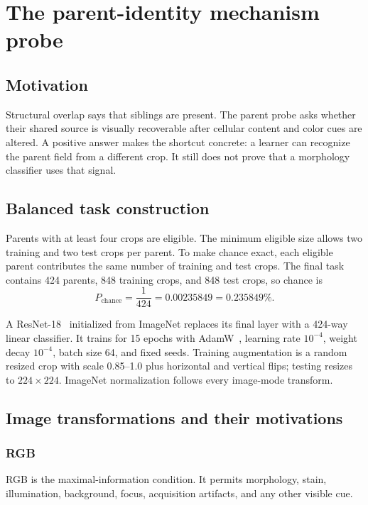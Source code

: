 \chapter{The parent-identity mechanism probe}\label{s1:ch:ch09_the_parent_identity_mechanism_probe}

\section{Motivation}

Structural overlap says that siblings are present. The parent probe asks whether their shared source is visually recoverable after cellular content and color cues are altered. A positive answer makes the shortcut concrete: a learner can recognize the parent field from a different crop. It still does not prove that a morphology classifier uses that signal.

\section{Balanced task construction}

Parents with at least four crops are eligible. The minimum eligible size allows two training and two test crops per parent. To make chance exact, each eligible parent contributes the same number of training and test crops. The final task contains 424 parents, 848 training crops, and 848 test crops, so chance is
\begin{equation}
P_{\mathrm{chance}}=\frac{1}{424}=0.00235849=0.235849\%.
\end{equation}

A ResNet-18~\cite{he2016resnet} initialized from ImageNet replaces its final layer with a 424-way linear classifier. It trains for 15 epochs with AdamW~\cite{loshchilov2019adamw}, learning rate $10^{-4}$, weight decay $10^{-4}$, batch size 64, and fixed seeds. Training augmentation is a random resized crop with scale 0.85--1.0 plus horizontal and vertical flips; testing resizes to $224\times224$. ImageNet normalization follows every image-mode transform.

\section{Image transformations and their motivations}

\subsection{RGB}
RGB is the maximal-information condition. It permits morphology, stain, illumination, background, focus, acquisition artifacts, and any other visible cue.

